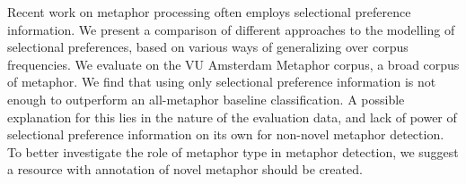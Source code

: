 Recent work on metaphor processing often employs selectional preference information. We present a comparison of different approaches to the modelling of selectional preferences, based on various ways of generalizing over corpus frequencies. We evaluate on the VU Amsterdam Metaphor corpus, a broad corpus of metaphor. We find that using only selectional preference information is not enough to  outperform an all-metaphor baseline classification. A possible explanation for this lies in the nature of the evaluation data, and lack of power of selectional preference information on its own for non-novel metaphor detection. To better investigate the role of metaphor type in metaphor detection, we suggest a resource with annotation of novel metaphor should be created.
